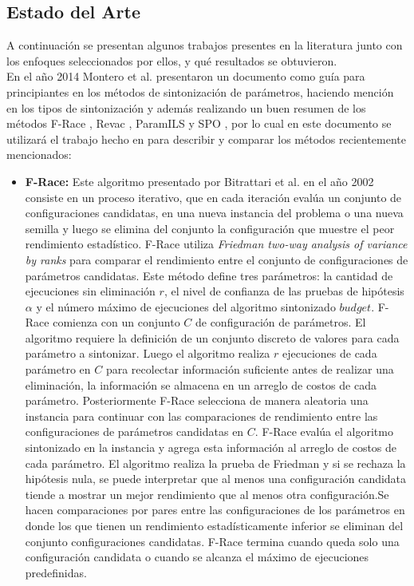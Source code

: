 \documentclass[letter, 10pt]{article}
\begin{document}
\begin{multicols}{2}
\section{Estado del Arte}
A continuación se presentan algunos trabajos presentes en la literatura junto con los enfoques seleccionados por ellos, y qué resultados se obtuvieron.\\

En el año 2014 Montero et al. \cite{Montero2014ABG} presentaron un documento como guía para principiantes en los métodos de sintonización de parámetros, haciendo mención en los tipos de sintonización y además realizando un buen resumen de los métodos F-Race \cite{Birattari2002ARA}, Revac \cite{Nannen2007RelevanceEA}, ParamILS \cite{Hutter2007AutomaticAC} y SPO \cite{BartzBeielstein2005SequentialPO}, por lo cual en este documento se utilizará el trabajo hecho en \cite{Montero2014ABG} para describir y comparar los métodos recientemente mencionados:
\begin{itemize}
    \item \textbf{F-Race:} 
    Este algoritmo presentado por Bitrattari et al.\cite{Birattari2002ARA} en el año 2002 consiste en un proceso iterativo, que en cada iteración evalúa un conjunto de configuraciones candidatas, en una nueva instancia del problema o una nueva semilla y luego se elimina del conjunto la configuración que muestre el peor rendimiento estadístico. F-Race utiliza \textit{Friedman two-way analysis of variance by ranks} para comparar el rendimiento entre el conjunto de configuraciones de parámetros candidatas. Este método define tres parámetros: la cantidad de ejecuciones sin eliminación $r$, el nivel de confianza de las pruebas de hipótesis $\alpha$ y el número máximo de ejecuciones del algoritmo sintonizado $budget$. F-Race comienza con un conjunto $C$ de configuración de parámetros. El algoritmo requiere la definición de un conjunto discreto de valores para cada parámetro a sintonizar. Luego el algoritmo realiza $r$ ejecuciones de cada parámetro en $C$ para recolectar información suficiente antes de realizar una eliminación, la información se almacena en un arreglo de costos de cada parámetro. Posteriormente F-Race selecciona de manera aleatoria una instancia para continuar con las comparaciones de rendimiento entre las configuraciones de parámetros candidatas en $C$. F-Race evalúa el algoritmo sintonizado en la instancia y agrega esta información al arreglo de costos de cada parámetro. El algoritmo realiza la prueba de Friedman y si se rechaza la hipótesis nula, se puede interpretar que al menos una configuración candidata tiende a mostrar un mejor rendimiento que al menos otra configuración.Se hacen comparaciones por pares entre las configuraciones de los parámetros en donde los que tienen un rendimiento estadísticamente inferior se eliminan del conjunto configuraciones candidatas. F-Race termina cuando queda solo una configuración candidata o cuando se alcanza el máximo de ejecuciones predefinidas. 

\end{itemize}
\end{multicols}
\end{document}
